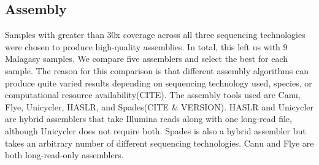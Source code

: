 \subsection{Assembly}
\begin{markdown}

Samples with greater than 30x coverage across all three sequencing technologies were chosen to produce high-quality assemblies. In total, this left us with 9 Malagasy samples. We compare five assemblers and select the best for each sample. The reason for this comparison is that different assembly algorithms can produce quite varied results depending on sequencing technology used, species, or computational resource availability(CITE).  
The assembly tools used are Canu, Flye, Unicycler, HASLR, and Spades(CITE \& VERSION). HASLR and Unicycler are hybrid assemblers that take Illumina reads along with one long-read file, although Unicycler does not require both. Spades is also a hybrid assembler but takes an arbitrary number of different sequencing technologies. Canu and Flye are both long-read-only assemblers.


\end{markdown}
